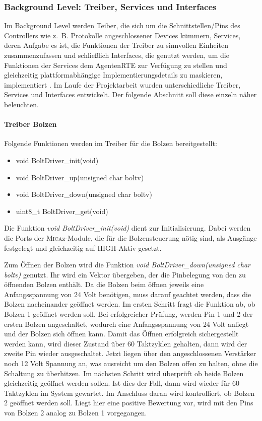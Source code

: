 \subsubsection{Background Level: Treiber, Services und Interfaces}
Im Background Level werden Teiber, die sich um die Schnittstellen/Pins des Controllers wie z.~B. Protokolle angeschlossener Devices\cite[S. 26]{Stasch:Hahn} kümmern, Services, deren Aufgabe es ist, die Funktionen der Treiber zu sinnvollen Einheiten zusammenzufassen und schließlich Interfaces, die genutzt werden, um die Funktionen der Services dem AgentenRTE zur Verfügung zu stellen und gleichzeitig plattformabhängige Implementierungsdetails zu maskieren, implementiert \cite[S. 26]{Stasch:Hahn}. Im Laufe der Projektarbeit wurden unterschiedliche Treiber, Services und Interfaces entwickelt. Der folgende Abschnitt soll diese einzeln näher beleuchten.

\paragraph{Treiber Bolzen}
Folgende Funktionen werden im Treiber für die Bolzen bereitgestellt:
\begin{itemize}
  \item void BoltDriver\_init(void)
  \item void BoltDriver\_up(unsigned char boltv)
  \item void BoltDriver\_down(unsigned char boltv)
  \item uint8\_t BoltDriver\_get(void)
\end{itemize} 
Die Funktion \textit{void BoltDriver\_init(void)} dient zur Initialisierung. Dabei werden die Ports der \textsc{Mica}z-Module, die für die Bolzensteuerung nötig sind, als Ausgänge festgelegt und gleichzeitig auf HIGH-Aktiv gesetzt.

Zum Öffnen der Bolzen wird die Funktion \textit{void BoltDriver\_down(unsigned char boltv)} genutzt. Ihr wird ein Vektor übergeben, der die Pinbelegung von den zu öffnenden Bolzen enthält. Da die Bolzen beim öffnen jeweils eine Anfangsspannung von 24 Volt benötigen, muss darauf geachtet werden, dass die Bolzen nacheinander geöffnet werden. Im ersten Schritt fragt die Funktion ab, ob Bolzen 1 geöffnet werden soll. Bei erfolgreicher Prüfung, werden Pin 1 und 2 der ersten Bolzen angeschaltet, wodurch eine Anfangsspannung von 24 Volt anliegt und der Bolzen sich öffnen kann. Damit das Öffnen erfolgreich sichergestellt werden kann, wird dieser Zustand über 60 Taktzyklen gehalten, dann wird der zweite Pin wieder ausgeschaltet. Jetzt liegen über den angeschlossenen Verstärker noch 12 Volt Spannung an, was ausreicht um den Bolzen offen zu halten, ohne die Schaltung zu überhitzen. Im nächsten Schritt wird überprüft ob beide Bolzen gleichzeitig geöffnet werden sollen. Ist dies der Fall, dann wird wieder für 60 Taktzyklen im System gewartet. Im Anschluss daran wird kontrolliert, ob Bolzen 2 geöffnet werden soll. Liegt hier eine positive Bewertung vor, wird mit den Pins von Bolzen 2 analog zu Bolzen 1 vorgegangen.

